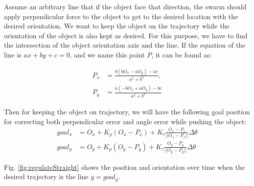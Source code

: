Assume an arbitrary line that if the object face that direction, the swarm should apply perpendicular force to the object to get to the desired location with the desired orientation.  We want to keep the object on the trajectory while the orientation of the object is also kept as desired. For this purpose, we have to find the intersection of the object orientation axis and the line. If the equation of the line is $ax+by+c =0$, and we name this point $P$, it can be found as:

\begin{align}
P_x &= \frac{b(bO_x-aO_y)-ac}{a^2 + b^2},\\ \nonumber
P_y &= \frac{a(-bO_x+aO_y)-bc}{a^2 + b^2}
\end{align}

Then for keeping the object on trajectory, we will have the following goal position for correcting both perpendicular error and angle error while pushing the object:
\begin{align}
goal_x &= O_x+ K_p (O_x-P_x)+ K_\tau \frac{O_x-P_x}{||O_x-P_x||}\Delta\theta \nonumber \\
goal_y &= O_y+ K_p (O_y-P_y)+ K_\tau \frac{O_y-P_y}{||O_y-P_y||}\Delta\theta \label{eq:Regulate}
\end{align}

Fig. \ref{fig:regulateStraight} shows the position and orientation over time when the desired trajectory is the line $y = goal_y$. 








